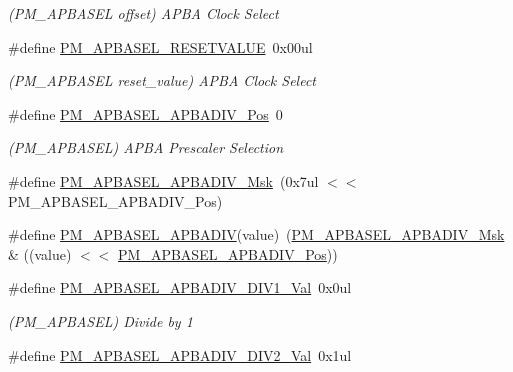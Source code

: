 \begin{DoxyCompactItemize}
\begin{DoxyCompactList}\small\item\em (P\+M\+\_\+\+A\+P\+B\+A\+S\+EL offset) A\+P\+BA Clock Select \end{DoxyCompactList}\item 
\#define \mbox{\hyperlink{group___s_a_m_d21___p_m_ga632e21ffc1e2afad7855aed504faf24b}{P\+M\+\_\+\+A\+P\+B\+A\+S\+E\+L\+\_\+\+R\+E\+S\+E\+T\+V\+A\+L\+UE}}~0x00ul
\begin{DoxyCompactList}\small\item\em (P\+M\+\_\+\+A\+P\+B\+A\+S\+EL reset\+\_\+value) A\+P\+BA Clock Select \end{DoxyCompactList}\item 
\#define \mbox{\hyperlink{group___s_a_m_d21___p_m_gab10103778b1cfc844b25db57307010e6}{P\+M\+\_\+\+A\+P\+B\+A\+S\+E\+L\+\_\+\+A\+P\+B\+A\+D\+I\+V\+\_\+\+Pos}}~0
\begin{DoxyCompactList}\small\item\em (P\+M\+\_\+\+A\+P\+B\+A\+S\+EL) A\+P\+BA Prescaler Selection \end{DoxyCompactList}\item 
\#define \mbox{\hyperlink{group___s_a_m_d21___p_m_ga559f3ad37b4bdcc8c4652370835af31f}{P\+M\+\_\+\+A\+P\+B\+A\+S\+E\+L\+\_\+\+A\+P\+B\+A\+D\+I\+V\+\_\+\+Msk}}~(0x7ul $<$$<$ P\+M\+\_\+\+A\+P\+B\+A\+S\+E\+L\+\_\+\+A\+P\+B\+A\+D\+I\+V\+\_\+\+Pos)
\item 
\#define \mbox{\hyperlink{group___s_a_m_d21___p_m_gaf122a339226217c6984f05b58039b153}{P\+M\+\_\+\+A\+P\+B\+A\+S\+E\+L\+\_\+\+A\+P\+B\+A\+D\+IV}}(value)~(\mbox{\hyperlink{group___s_a_m_d21___p_m_ga559f3ad37b4bdcc8c4652370835af31f}{P\+M\+\_\+\+A\+P\+B\+A\+S\+E\+L\+\_\+\+A\+P\+B\+A\+D\+I\+V\+\_\+\+Msk}} \& ((value) $<$$<$ \mbox{\hyperlink{group___s_a_m_d21___p_m_gab10103778b1cfc844b25db57307010e6}{P\+M\+\_\+\+A\+P\+B\+A\+S\+E\+L\+\_\+\+A\+P\+B\+A\+D\+I\+V\+\_\+\+Pos}}))
\item 
\#define \mbox{\hyperlink{group___s_a_m_d21___p_m_ga8a305c10594a48164ea69840686ea687}{P\+M\+\_\+\+A\+P\+B\+A\+S\+E\+L\+\_\+\+A\+P\+B\+A\+D\+I\+V\+\_\+\+D\+I\+V1\+\_\+\+Val}}~0x0ul
\begin{DoxyCompactList}\small\item\em (P\+M\+\_\+\+A\+P\+B\+A\+S\+EL) Divide by 1 \end{DoxyCompactList}\item 
\#define \mbox{\hyperlink{group___s_a_m_d21___p_m_gaeb1943a5c678bf949d1a91019469b0fb}{P\+M\+\_\+\+A\+P\+B\+A\+S\+E\+L\+\_\+\+A\+P\+B\+A\+D\+I\+V\+\_\+\+D\+I\+V2\+\_\+\+Val}}~0x1ul

\end{DoxyCompactItemize}
